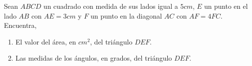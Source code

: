 Sean $ABCD$ un cuadrado con medida de sus lados igual a $5cm$, $E$ un punto en el lado $AB$ con $AE = 3 cm$ y $F$ un punto en la diagonal $AC$ con $AF = 4FC$. Encuentra,
 \begin{enumerate} 
 \item El valor del área, en $cm^2$, del triángulo $DEF$.
 \item  Las medidas de los ángulos, en grados, del triángulo $DEF$.
 \end{enumerate} 
